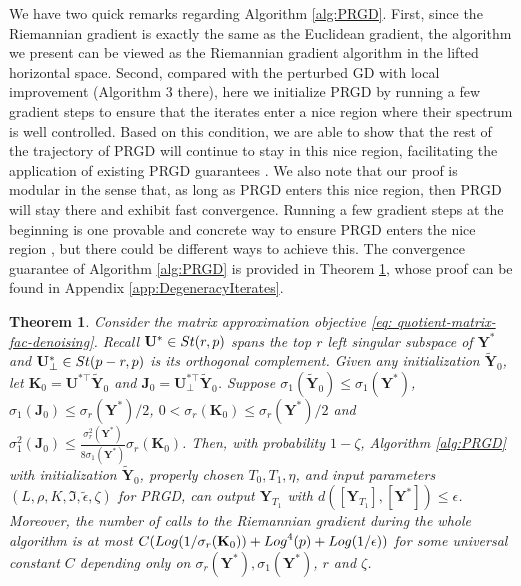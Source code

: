 \documentclass[11pt]{article}
\newtheorem{Theorem}{Theorem}
\newcommand{\0}{{\mathbf{0}}}
\newcommand{\1}{{\mathbf{1}}}
\newcommand{\U}{{\mathbf{U}}}
\newcommand{\K}{{\mathbf{K}}}
\newcommand{\J}{{\mathbf{J}}}
\newcommand{\Y}{{\mathbf{Y}}}
\newcommand{\st}{{\rm St}}
\renewcommand{\log}{{\rm Log}}
\begin{document}
{We have two quick remarks regarding Algorithm \ref{alg:PRGD}. First, since the Riemannian gradient is exactly the same as the Euclidean gradient, the algorithm we present can be viewed as the Riemannian gradient algorithm in the lifted horizontal space. Second, compared with the perturbed GD with local improvement \cite{jin2017escape} (Algorithm 3 there), here we initialize PRGD by running a few gradient steps to ensure that the iterates enter a nice region where their spectrum is well controlled. Based on this condition, we are able to show that the rest of the trajectory of PRGD will continue to stay in this nice region, facilitating the application of existing PRGD guarantees \cite{criscitiello2019efficiently,sun2019escaping}. We also note that our proof is modular in the sense that, as long as PRGD enters this nice region, then PRGD will stay there and exhibit fast convergence. Running a few gradient steps at the beginning is one provable and concrete way to ensure PRGD enters the nice region \cite{chen2023fast}, but there could be different ways to achieve this. The convergence guarantee of Algorithm \ref{alg:PRGD} is provided in Theorem \ref{th:application}, whose proof can be found in Appendix \ref{app:DegeneracyIterates}.


\begin{Theorem} \label{th:application}
	Consider the matrix approximation objective \eqref{eq: quotient-matrix-fac-denoising}. Recall $\U^* \in \st(r,p)$ spans the top $r$ left singular subspace of $\Y^*$ and $\U^*_{\perp}\in \st(p-r,p)$ is its orthogonal complement. Given any initialization $\widetilde{\Y}_0$, let $\K_0 = \U^{*\top } \widetilde{\Y}_0$ and $\J_0 = \U^{*\top }_{\perp} \widetilde{\Y}_0$. Suppose $\sigma_1(\widetilde{\Y}_0) \leq \sigma_1(\Y^*)$, $\sigma_1(\J_0) \leq \sigma_r(\Y^*)/2$, $0 < \sigma_r(\K_0) \leq \sigma_r(\Y^*)/2$ and $\sigma_1^2(\J_0) \leq \frac{\sigma^2_r(\Y^*)}{8 \sigma_1(\Y^*)} \sigma_r(\K_0)$. Then, with probability $1 - \zeta$, Algorithm \ref{alg:PRGD} with initialization $\widetilde{\Y}_0$, properly chosen $T_0, T_1, \eta$, and input parameters $(L, \rho, K, \mathfrak{I}, \widetilde{\epsilon},\zeta)$ for PRGD, can output $\Y_{T_1}$ with $d([\Y_{T_1}], [\Y^*]) \leq \epsilon$. Moreover, the number of calls to the Riemannian gradient during the whole algorithm is at most $C(\log(1/\sigma_r(\K_0)) + \log^4(p) + \log(1/\epsilon))$ for some universal constant $C$ depending only on $\sigma_r(\Y^*), \sigma_1(\Y^*)$, $r$ and $\zeta$.
\end{Theorem}

}
\end{document}
